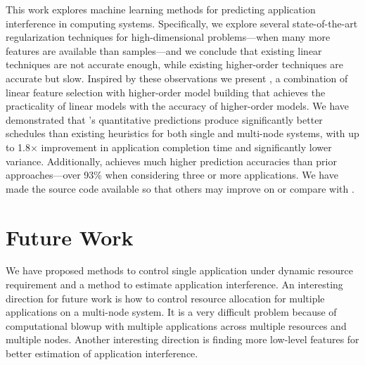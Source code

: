 This work explores machine learning methods for predicting
application interference in computing systems.  Specifically, we
explore several state-of-the-art regularization techniques for
high-dimensional problems---when many more features are available than
samples---and we conclude that existing linear techniques are not
accurate enough, while existing higher-order techniques are accurate
but slow.  Inspired by these observations we present \SYSTEMESP{}, a
combination of linear feature selection with higher-order model
building that achieves the practicality of linear models with the
accuracy of higher-order models.  We have demonstrated that
\SYSTEMESP{}'s quantitative predictions produce significantly better
schedules than existing heuristics for both single and multi-node
systems, with up to 1.8$\times$ improvement in application completion
time and significantly lower variance.  Additionally, \SYSTEMESP{}
achieves much higher prediction accuracies than prior
approaches---over 93\% when considering three or more applications.
We have made the source code available so that others may improve on
or compare with \SYSTEMESP{}.

\section{Future Work}
We have proposed methods to control single application under dynamic resource
requirement and a method to estimate application interference. An interesting
direction for future work is how to control resource allocation for multiple
applications on a multi-node system. It is a very difficult problem because of
computational blowup with multiple applications across multiple resources and
multiple nodes. Another interesting direction is finding more low-level features for better
estimation of application interference.
